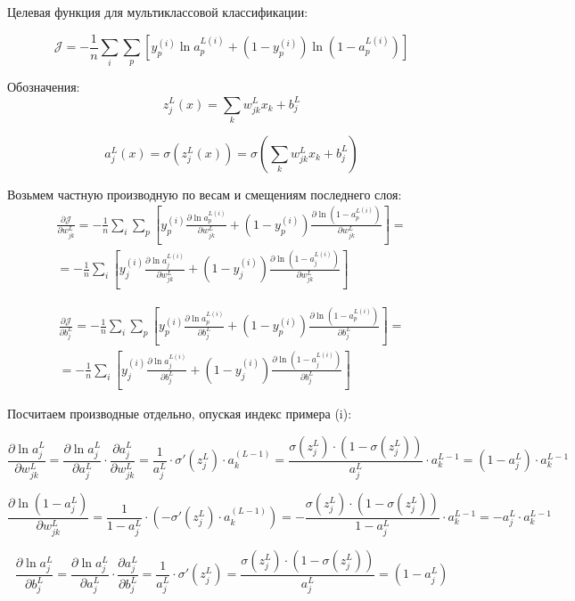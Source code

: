 \documentclass{article}
\begin{document}

Целевая функция для мультиклассовой классификации:

\[
\mathcal{J} = -\frac{1}{n} \sum_i \sum_p \left[ y_p^{(i)} \ln a_p^{L(i)} + (1 - y_p^{(i)}) \ln (1 - a_p^{L(i)}) \right]
\]

Обозначения:
\[
z_j^L(x) = \sum_k w_{jk}^L x_k + b_j^L
\]

\[
a_j^L(x) = \sigma \left( z_j^L(x) \right) = \sigma \left( \sum_k w_{jk}^L x_k + b_j^L \right)
\]

Возьмем частную производную по весам и смещениям последнего слоя:
\[
\begin{gathered}
\frac{\partial \mathcal{J}}{\partial w_{jk}^L} = -\frac{1}{n} \sum_i \sum_p \left[ y_p^{(i)} \frac{\partial \ln a_p^{L(i)}}{\partial w_{jk}^L} + (1 - y_p^{(i)}) \frac{\partial \ln (1 - a_p^{L(i)})}{\partial w_{jk}^L} \right] = \\
= -\frac{1}{n} \sum_i \left[ y_j^{(i)} \frac{\partial \ln a_j^{L(i)}}{\partial w_{jk}^L} + (1 - y_j^{(i)}) \frac{\partial \ln (1 - a_j^{L(i)})}{\partial w_{jk}^L} \right]
\end{gathered}
\]

\[
\begin{gathered}
\frac{\partial \mathcal{J}}{\partial b_{j}^L} = -\frac{1}{n} \sum_i \sum_p \left[ y_p^{(i)} \frac{\partial \ln a_p^{L(i)}}{\partial b_{j}^L} + (1 - y_p^{(i)}) \frac{\partial \ln (1 - a_p^{L(i)})}{\partial b_{j}^L} \right] = \\
= -\frac{1}{n} \sum_i \left[ y_j^{(i)} \frac{\partial \ln a_j^{L(i)}}{\partial b_{j}^L} + (1 - y_j^{(i)}) \frac{\partial \ln (1 - a_j^{L(i)})}{\partial b_{j}^L} \right]
\end{gathered}
\]


Посчитаем производные отдельно, опуская индекс примера (i):

\[
\frac{\partial \ln a_j^L}{\partial w_{jk}^L} = \frac{\partial \ln a_j^L}{\partial a_j^L} \cdot \frac{\partial a_j^L}{\partial w_{jk}^L} = \frac{1}{a_j^L} \cdot \sigma' (z_j^L) \cdot a_k^{(L-1)} = \frac{\sigma(z_j^L) \cdot (1 - \sigma(z_j^L))}{a_j^L} \cdot a_k^{L-1} = (1 - a_j^L) \cdot a_k^{L-1}
\]

\[
\frac{\partial \ln (1 - a_j^L)}{\partial w_{jk}^L} = \frac{1}{1 - a_j^L} \cdot \left( -\sigma' (z_j^L) \cdot a_k^{(L-1)} \right) = - \frac{\sigma(z_j^L) \cdot (1 - \sigma(z_j^L))}{1 - a_j^L} \cdot a_k^{L-1} = -a_j^L \cdot a_k^{L-1}
\]

\[
\frac{\partial \ln a_j^L}{\partial b_{j}^L} = \frac{\partial \ln a_j^L}{\partial a_j^L} \cdot \frac{\partial a_j^L}{\partial b_{j}^L} = \frac{1}{a_j^L} \cdot \sigma' (z_j^L) = \frac{\sigma(z_j^L) \cdot (1 - \sigma(z_j^L))}{a_j^L} = (1 - a_j^L)
\]
\end{document}
